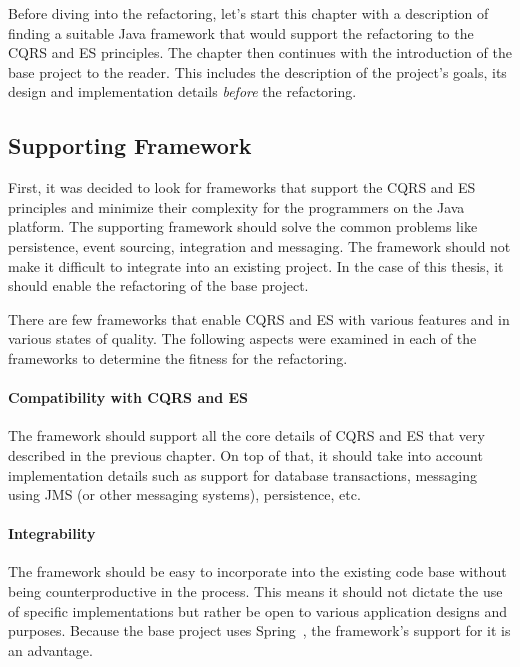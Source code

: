 \documentclass{book}
\begin{document}
Before diving into the refactoring, let's start this chapter with a
description of finding a suitable Java framework that would support the
refactoring to the CQRS and ES principles. The chapter then continues
with the introduction of the base project to the reader. This includes
the description of the project's goals, its design and implementation
details \emph{before} the refactoring.


\subsection{Supporting Framework}\label{supporting-framework}

First, it was decided to look for frameworks that support the CQRS and
ES principles and minimize their complexity for the programmers on the
Java platform. The supporting framework should solve the common problems
like persistence, event sourcing, integration and messaging. The
framework should not make it difficult to integrate into an existing
project. In the case of this thesis, it should enable the refactoring of
the base project.

There are few frameworks that enable CQRS and ES with various features
and in various states of quality. The following aspects were examined in
each of the frameworks to determine the fitness for the refactoring.

\paragraph{Compatibility with CQRS and
ES}\label{compatibility-with-cqrs-and-es}

The framework should support all the core details of CQRS and ES that
very described in the previous chapter. On top of that, it should take
into account implementation details such as support for database
transactions, messaging using JMS (or other messaging systems),
persistence, etc.

\paragraph{Integrability}\label{integrability}

The framework should be easy to incorporate into the existing code base
without being counterproductive in the process. This means it should not
dictate the use of specific implementations but rather be open to
various application designs and purposes. Because the base project uses Spring~\cite{spring},
the framework's support for it is an advantage.
\end{document}
